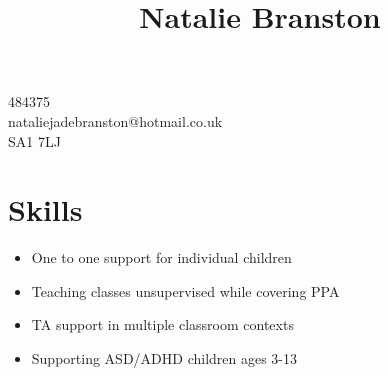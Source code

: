 \documentclass[10pt]{article}
\title{\bfseries\Huge Natalie Branston}
\date{}
\author{}
\begin{document}
\maketitle \vspace{-7em}

\section*{}
\faPhone {} 484375\\
\faEnvelope \quad nataliejadebranston@hotmail.co.uk\\
\faMapMarker \quad SA1 7LJ

\section*{Skills}
\begin{itemize} \setlength\itemsep{-0.25em}
	\item One to one support for individual children
	\item Teaching classes unsupervised while covering PPA
	\item TA support in multiple classroom contexts
	\item Supporting ASD/ADHD children ages 3-13
\end{itemize}

\end{document}

